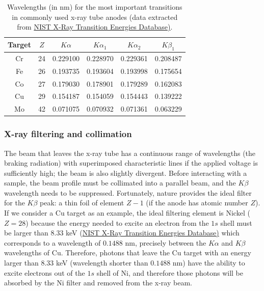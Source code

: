 \begin{table}[h!]
\centering\leavevmode
\begin{tabular}{|c|c|c|c|c|c|}
\hline
Target & $Z$ & $K\alpha$ & $K\alpha_1$ & $K\alpha_2$ & $K\beta_1$ \\
\hline\hline
Cr & 24 & 0.229100 & 0.228970 & 0.229361 & 0.208487 \\
Fe & 26 & 0.193735 & 0.193604 & 0.193998 & 0.175654 \\
Co & 27 & 0.179030 & 0.178901 & 0.179289 & 0.162083 \\
Cu & 29 & 0.154187 & 0.154059 & 0.154443 & 0.139222 \\
Mo & 42 & 0.071075 & 0.070932 & 0.071361 & 0.063229 \\
\hline 
\end{tabular}
\caption{\label{\chabbr:tb:NIST}Wavelengths (in nm) for the most important transitions in commonly used x-ray tube anodes (data extracted from \href{https://physics.nist.gov/PhysRefData/XrayTrans/Html/search.html}{NIST X-Ray Transition Energies Database)}.}
\end{table}

\subsubsection{X-ray filtering and collimation}\label{\chabbr:ssec:Xfilter}

The beam that leaves the x-ray tube has a continuous range of wavelengths (the braking radiation) with superimposed characteristic lines if the applied voltage is sufficiently high; the beam is also slightly divergent.   Before interacting with a sample, the beam profile must be collimated into a parallel beam, and the $K\beta$ wavelength needs to be suppressed. Fortunately, nature provides the ideal filter for the $K\beta$ peak: a thin foil of element $Z-1$ (if the anode has atomic number $Z$).  If we consider a Cu target as an example, the ideal filtering element is Nickel ($Z=28$) because the energy needed to excite an electron from the $1s$ shell must be larger than $8.33$ keV (\href{https://physics.nist.gov/PhysRefData/XrayTrans/Html/search.html}{NIST X-Ray Transition Energies Database)} which corresponds to a wavelength of $0.1488$ nm, precisely between the $K\alpha$ and $K\beta$ wavelengths of Cu. Therefore, photons that leave the Cu target with an energy larger than $8.33$ keV (wavelength shorter than $0.1488$ nm) have the ability to excite electrons out of the $1s$ shell of Ni, and therefore those photons will be absorbed by the Ni filter and removed from the x-ray beam. 

